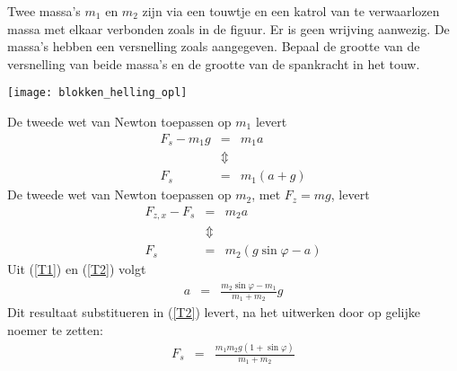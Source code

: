 \documentclass{ximera}
\begin{document}
	
	\begin{exercise}
	Twee massa's $m_1$ en $m_2$ zijn via een touwtje en een katrol van te verwaarlozen massa met elkaar verbonden zoals in de figuur. Er is geen wrijving aanwezig. De massa's hebben een versnelling zoals aangegeven.
	Bepaal de grootte van de versnelling van beide massa's en de grootte van de spankracht in het touw.
	\begin{image}
	\texttt{[image: blokken\_helling\_opl]}
	\end{image}

	\begin{oplossing}
	De tweede wet van Newton toepassen op $m_1$ levert
	\begin{eqnarray}
	F_s-m_1g&=&m_1a\nonumber\\
	&\Updownarrow&\nonumber\\
	F_s&=&m_1(a+g)
	\end{eqnarray}
	De tweede wet van Newton toepassen op $m_2$, met $F_z=mg$, levert
	\begin{eqnarray}
	F_{z,x}-F_s&=&m_2a\nonumber\\
	&\Updownarrow&\nonumber\\
	F_s&=&m_2(g\sin{\varphi}-a)
	\end{eqnarray}
	Uit (\ref{T1}) en (\ref{T2}) volgt
	\begin{eqnarray}
	a&=&\frac{m_2\sin{\varphi}-m_1}{m_1+m_2}g\nonumber
	\end{eqnarray}
	Dit resultaat substitueren in (\ref{T2}) levert, na het uitwerken door op ge\-lij\-ke noemer te zetten:
	\begin{eqnarray}
	F_s&=&\frac{m_1m_2g(1+\sin{\varphi})}{m_1+m_2}\nonumber
	\end{eqnarray}
	\end{oplossing}
	\end{exercise}
	
	
	
\end{document}
